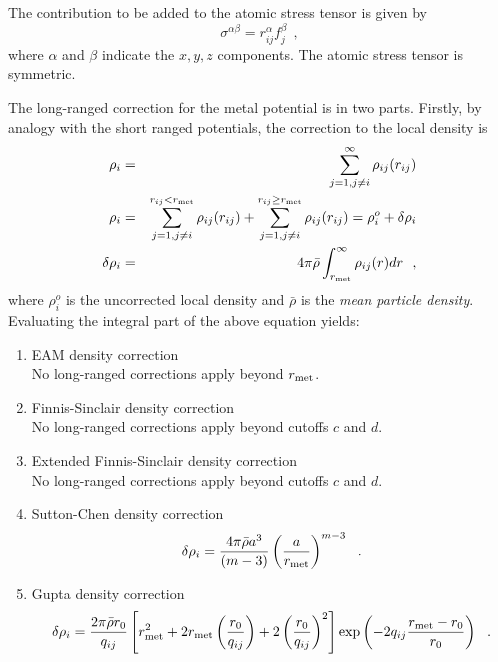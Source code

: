 The contribution to be added to the atomic stress tensor is
given by
\begin{equation}
\sigma^{\alpha \beta} = r_{ij}^{\alpha} f_{j}^{\beta}~~,
\end{equation}
where $\alpha$ and $\beta$ indicate the $x,y,z$ components.  The
atomic stress tensor is symmetric.

The long-ranged correction
for the \D metal potential is in two parts.  Firstly, by analogy
with the short ranged potentials, the correction to the
local density is
\begin{eqnarray}
\rho_{i} &=& \sum_{j=1, j \ne i}^{\infty} \rho_{ij}(r_{ij}) \nonumber \\
\rho_{i} &=& \sum_{j=1, j \ne i}^{r_{ij}<r_{\rm met}} \rho_{ij}(r_{ij}) +
\sum_{j=1, j \ne i}^{r_{ij} \ge r_{\rm met}} \rho_{ij}(r_{ij}) =
\rho_{i}^{o} + \delta \rho_{i} \\
\delta \rho_{i} &=& 4 \pi \bar{\rho} \int_{r_{\rm met}}^{\infty} \rho_{ij}(r) dr~~, \nonumber
\end{eqnarray}
where $\rho_{i}^{o}$ is the uncorrected local density and
$\bar{\rho}$ is the {\em mean particle density}.  Evaluating the
integral part of the above equation yields:
\begin{enumerate}
\item EAM density correction \\
No long-ranged corrections apply beyond $r_{\rm met}$.
\item Finnis-Sinclair density correction \\
No long-ranged corrections apply beyond cutoffs $c$ and $d$.
\item Extended Finnis-Sinclair density correction \\
No long-ranged corrections apply beyond cutoffs $c$ and $d$.
\item Sutton-Chen density correction
\begin{eqnarray}
\delta \rho_{i} = \frac{4 \pi \bar{\rho} a^{3}}{(m-3)}
\left( \frac{a}{r_{\rm met}} \right)^{m-3}~~.
\end{eqnarray}
\item Gupta density correction
\begin{eqnarray}
\delta \rho_{i} = \frac{2 \pi \bar{\rho} r_{0}}{q_{ij}}
\left[ r_{\rm met}^{2} + 2 r_{\rm met} \left(\frac{r_{0}}{q_{ij}}\right) +
2 \left(\frac{r_{0}}{q_{ij}}\right)^{2} \right]
\exp \left( -2 q_{ij} \frac{r_{\rm met}-r_{0}}{r_{0}}\right)~~.
\end{eqnarray}
\end{enumerate}
